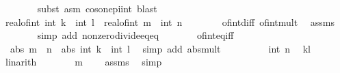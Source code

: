 \begin{isabellebody}
\ \ \ \ \ \ \isamarkupfalse%
\ {\isacharparenleft}{\kern0pt}subst\ {\isacharparenleft}{\kern0pt}asm{\isacharparenright}{\kern0pt}\ cos{\isacharunderscore}{\kern0pt}one{\isacharunderscore}{\kern0pt}{}pi{\isacharunderscore}{\kern0pt}int{\isacharparenright}{\kern0pt}\ blast\isanewline
\ \ \ \ \isamarkupfalse%
\ {\isachardoublequoteopen}real{\isacharunderscore}{\kern0pt}of{\isacharunderscore}{\kern0pt}int\ {\isacharparenleft}{\kern0pt}int\ k\ {\isacharminus}{\kern0pt}\ int\ l{\isacharparenright}{\kern0pt}\ {\isacharequal}{\kern0pt}\ real{\isacharunderscore}{\kern0pt}of{\isacharunderscore}{\kern0pt}int\ {\isacharparenleft}{\kern0pt}m\ {\isacharasterisk}{\kern0pt}\ int\ n{\isacharparenright}{\kern0pt}{\isachardoublequoteclose}\isanewline
\ \ \ \ \ \ \isamarkupfalse%
\ of{\isacharunderscore}{\kern0pt}int{\isacharunderscore}{\kern0pt}diff\ of{\isacharunderscore}{\kern0pt}int{\isacharunderscore}{\kern0pt}mult\ \isamarkupfalse%
\ assms\isanewline
\ \ \ \ \ \ \isamarkupfalse%
\ {\isacharparenleft}{\kern0pt}simp\ add{\isacharcolon}{\kern0pt}\ nonzero{\isacharunderscore}{\kern0pt}divide{\isacharunderscore}{\kern0pt}eq{\isacharunderscore}{\kern0pt}eq{\isacharparenright}{\kern0pt}\isanewline
\ \ \ \ \isamarkupfalse%
\ \isamarkupfalse%
\ of{\isacharunderscore}{\kern0pt}int{\isacharunderscore}{\kern0pt}eq{\isacharunderscore}{\kern0pt}iff\isanewline
\ \ \ \ \isamarkupfalse%
\ \isamarkupfalse%
\ {\isacharasterisk}{\kern0pt}{\isacharcolon}{\kern0pt}\ {\isachardoublequoteopen}abs\ m\ {\isacharasterisk}{\kern0pt}\ n\ {\isacharequal}{\kern0pt}\ abs\ {\isacharparenleft}{\kern0pt}int\ k\ {\isacharminus}{\kern0pt}\ int\ l{\isacharparenright}{\kern0pt}{\isachardoublequoteclose}\ \isamarkupfalse%
\ {\isacharparenleft}{\kern0pt}simp\ add{\isacharcolon}{\kern0pt}\ abs{\isacharunderscore}{\kern0pt}mult{\isacharparenright}{\kern0pt}\isanewline
\ \ \ \ \isamarkupfalse%
\ \isamarkupfalse%
\ {\isachardoublequoteopen}{\isasymdots}\ {\isacharless}{\kern0pt}\ int\ n{\isachardoublequoteclose}\ \isamarkupfalse%
\ kl\ \isamarkupfalse%
\ linarith\isanewline
\ \ \ \ \isamarkupfalse%
\ \isamarkupfalse%
\ {\isachardoublequoteopen}m\ {\isacharequal}{\kern0pt}\ {}{\isachardoublequoteclose}\ \isamarkupfalse%
\ assms\ \isamarkupfalse%
\ simp\isanewline
\ \ \ \ \isamarkupfalse%

\end{isabellebody}
